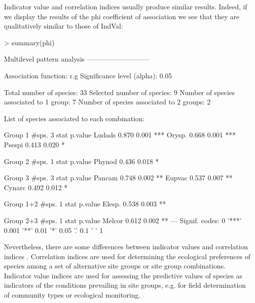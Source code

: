 \documentclass[11pt,a4paper]{article}
\begin{document}
Indicator value and correlation indices usually produce similar results. Indeed, if we display the results of the phi coefficient of association we see that they are qualitatively similar to those of IndVal: 
\begin{Schunk}
\begin{Sinput}
> summary(phi)
\end{Sinput}
\begin{Soutput}
 Multilevel pattern analysis
 ---------------------------

 Association function: r.g
 Significance level (alpha): 0.05

 Total number of species: 33
 Selected number of species: 9 
 Number of species associated to 1 group: 7 
 Number of species associated to 2 groups: 2 

 List of species associated to each combination: 

 Group 1  #sps.  3 
        stat p.value    
Ludads 0.870   0.001 ***
Orysp. 0.668   0.001 ***
Psespi 0.413   0.020 *  

 Group 2  #sps.  1 
        stat p.value  
Phynod 0.436   0.018 *

 Group 3  #sps.  3 
        stat p.value   
Pancam 0.748   0.002 **
Eupvac 0.537   0.007 **
Cynarc 0.492   0.012 * 

 Group 1+2  #sps.  1 
        stat p.value   
Elesp. 0.538   0.003 **

 Group 2+3  #sps.  1 
        stat p.value   
Melcor 0.612   0.002 **
---
Signif. codes:  0 '***' 0.001 '**' 0.01 '*' 0.05 '.' 0.1 ' ' 1 
\end{Soutput}
\end{Schunk}
Nevertheless, there are some differences between indicator values and correlation indices \citep{DeCaceres2008}\citep{DeCaceres2009}. Correlation indices are used for determining the ecological preferences of species among a set of alternative site groups or site group combinations. Indicator value indices are used for assessing the predictive values of species as indicators of the conditions prevailing in site groups, e.g. for field determination of community types or ecological monitoring.
\end{document}
